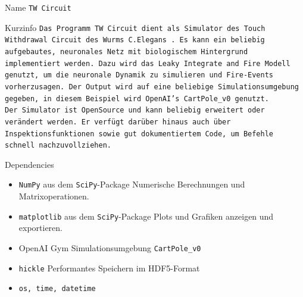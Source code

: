 \begin{minipage}[b]{0.61\textwidth}
	\begin{mybox}{Name}
		\texttt{TW Circuit}
	\end{mybox}
	\begin{mybox}{Kurzinfo}
		\texttt{Das Programm TW Circuit dient als Simulator des Touch Withdrawal Circuit des Wurms C.Elegans \cite{WormLevelRL}. Es kann ein beliebig aufgebautes, neuronales Netz mit biologischem Hintergrund implementiert werden. Dazu wird das Leaky Integrate and Fire Modell genutzt, um die neuronale Dynamik zu simulieren und Fire-Events vorherzusagen. Der Output wird auf eine beliebige Simulationsumgebung gegeben, in diesem Beispiel wird OpenAI's CartPole\_v0 genutzt.\\ Der Simulator ist OpenSource und kann beliebig erweitert oder verändert werden. Er verfügt darüber hinaus auch über Inspektionsfunktionen sowie gut dokumentiertem Code, um Befehle schnell nachzuvollziehen.}
	\end{mybox}
	\begin{mybox}{Dependencies}
		\begin{itemize}
			\item \texttt{NumPy} aus dem \texttt{SciPy}-Package
			\subitem Numerische Berechnungen und Matrixoperationen.
			\item \texttt{matplotlib} aus dem \texttt{SciPy}-Package
			\subitem Plots und Grafiken anzeigen und exportieren.
			\item OpenAI Gym
			\subitem Simulationsumgebung \texttt{CartPole\_v0}
			\item \texttt{hickle}
			\subitem Performantes Speichern im HDF5-Format
			\item \texttt{os, time, datetime}
		\end{itemize}
	\end{mybox}
\end{minipage}
\hfill
